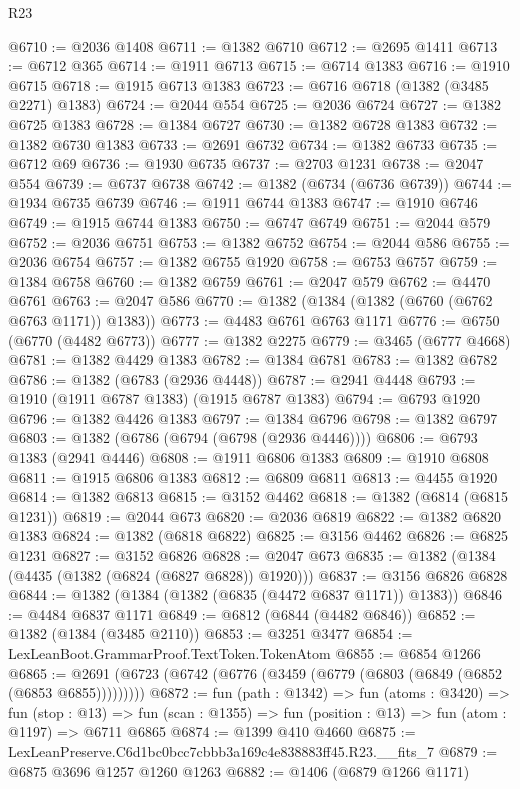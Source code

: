 \begin{lexlean}{R23}
\begin{coremodule}
@6710 := @2036 @1408
@6711 := @1382 @6710
@6712 := @2695 @1411
@6713 := @6712 @365
@6714 := @1911 @6713
@6715 := @6714 @1383
@6716 := @1910 @6715
@6718 := @1915 @6713 @1383
@6723 := @6716 @6718 (@1382 (@3485 @2271) @1383)
@6724 := @2044 @554
@6725 := @2036 @6724
@6727 := @1382 @6725 @1383
@6728 := @1384 @6727
@6730 := @1382 @6728 @1383
@6732 := @1382 @6730 @1383
@6733 := @2691 @6732
@6734 := @1382 @6733
@6735 := @6712 @69
@6736 := @1930 @6735
@6737 := @2703 @1231
@6738 := @2047 @554
@6739 := @6737 @6738
@6742 := @1382 (@6734 (@6736 @6739))
@6744 := @1934 @6735 @6739
@6746 := @1911 @6744 @1383
@6747 := @1910 @6746
@6749 := @1915 @6744 @1383
@6750 := @6747 @6749
@6751 := @2044 @579
@6752 := @2036 @6751
@6753 := @1382 @6752
@6754 := @2044 @586
@6755 := @2036 @6754
@6757 := @1382 @6755 @1920
@6758 := @6753 @6757
@6759 := @1384 @6758
@6760 := @1382 @6759
@6761 := @2047 @579
@6762 := @4470 @6761
@6763 := @2047 @586
@6770 := @1382 (@1384 (@1382 (@6760 (@6762 @6763 @1171)) @1383))
@6773 := @4483 @6761 @6763 @1171
@6776 := @6750 (@6770 (@4482 @6773))
@6777 := @1382 @2275
@6779 := @3465 (@6777 @4668)
@6781 := @1382 @4429 @1383
@6782 := @1384 @6781
@6783 := @1382 @6782
@6786 := @1382 (@6783 (@2936 @4448))
@6787 := @2941 @4448
@6793 := @1910 (@1911 @6787 @1383) (@1915 @6787 @1383)
@6794 := @6793 @1920
@6796 := @1382 @4426 @1383
@6797 := @1384 @6796
@6798 := @1382 @6797
@6803 := @1382 (@6786 (@6794 (@6798 (@2936 @4446))))
@6806 := @6793 @1383 (@2941 @4446)
@6808 := @1911 @6806 @1383
@6809 := @1910 @6808
@6811 := @1915 @6806 @1383
@6812 := @6809 @6811
@6813 := @4455 @1920
@6814 := @1382 @6813
@6815 := @3152 @4462
@6818 := @1382 (@6814 (@6815 @1231))
@6819 := @2044 @673
@6820 := @2036 @6819
@6822 := @1382 @6820 @1383
@6824 := @1382 (@6818 @6822)
@6825 := @3156 @4462
@6826 := @6825 @1231
@6827 := @3152 @6826
@6828 := @2047 @673
@6835 := @1382 (@1384 (@4435 (@1382 (@6824 (@6827 @6828)) @1920)))
@6837 := @3156 @6826 @6828
@6844 := @1382 (@1384 (@1382 (@6835 (@4472 @6837 @1171)) @1383))
@6846 := @4484 @6837 @1171
@6849 := @6812 (@6844 (@4482 @6846))
@6852 := @1382 (@1384 (@3485 @2110))
@6853 := @3251 @3477
@6854 := LexLeanBoot.GrammarProof.TextToken.TokenAtom
@6855 := @6854 @1266
@6865 := @2691 (@6723 (@6742 (@6776 (@3459 (@6779 (@6803 (@6849 (@6852 (@6853 @6855)))))))))
@6872 := fun (path : @1342) =>
  fun (atoms : @3420) =>
  fun (stop : @13) =>
  fun (scan : @1355) => fun (position : @13) => fun (atom : @1197) => @6711 @6865
@6874 := @1399 @410 @4660
@6875 := LexLeanPreserve.C6d1bc0bcc7cbbb3a169c4e838883ff45.R23.__fits_7
@6879 := @6875 @3696 @1257 @1260 @1263
@6882 := @1406 (@6879 @1266 @1171)

\end{coremodule}
\end{lexlean}
